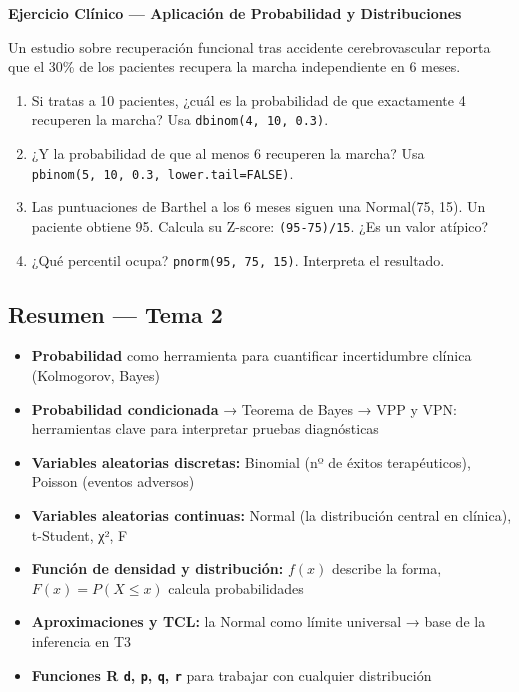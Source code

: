 \documentclass[
  letterpaper,
  DIV=11,
  numbers=noendperiod]{scrartcl}
\providecommand{\tightlist}{%
  \setlength{\itemsep}{0pt}\setlength{\parskip}{0pt}}
\begin{document}
\textbf{Ejercicio Clínico --- Aplicación de Probabilidad y
Distribuciones}

Un estudio sobre recuperación funcional tras accidente cerebrovascular
reporta que el 30\% de los pacientes recupera la marcha independiente en
6 meses.

\begin{enumerate}
\def\labelenumi{\arabic{enumi}.}
\tightlist
\item
  Si tratas a 10 pacientes, ¿cuál es la probabilidad de que exactamente
  4 recuperen la marcha? Usa \texttt{dbinom(4,\ 10,\ 0.3)}.
\item
  ¿Y la probabilidad de que al menos 6 recuperen la marcha? Usa
  \texttt{pbinom(5,\ 10,\ 0.3,\ lower.tail=FALSE)}.
\item
  Las puntuaciones de Barthel a los 6 meses siguen una Normal(75, 15).
  Un paciente obtiene 95. Calcula su Z-score: \texttt{(95-75)/15}. ¿Es
  un valor atípico?
\item
  ¿Qué percentil ocupa? \texttt{pnorm(95,\ 75,\ 15)}. Interpreta el
  resultado.
\end{enumerate}

\subsection{Resumen --- Tema 2}\label{resumen-tema-2}

\begin{itemize}
\tightlist
\item
  \textbf{Probabilidad} como herramienta para cuantificar incertidumbre
  clínica (Kolmogorov, Bayes)
\item
  \textbf{Probabilidad condicionada} → Teorema de Bayes → VPP y VPN:
  herramientas clave para interpretar pruebas diagnósticas
\item
  \textbf{Variables aleatorias discretas:} Binomial (nº de éxitos
  terapéuticos), Poisson (eventos adversos)
\item
  \textbf{Variables aleatorias continuas:} Normal (la distribución
  central en clínica), t-Student, χ², F
\item
  \textbf{Función de densidad y distribución:} \(f(x)\) describe la
  forma, \(F(x)=P(X \leq x)\) calcula probabilidades
\item
  \textbf{Aproximaciones y TCL:} la Normal como límite universal → base
  de la inferencia en T3
\item
  \textbf{Funciones R \texttt{d}, \texttt{p}, \texttt{q}, \texttt{r}}
  para trabajar con cualquier distribución
\end{itemize}
\end{document}
